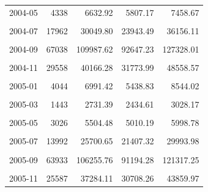 \begin{longtable}[t]{crrrr}
2004-05 & 4338 & 6632.92 & 5807.17 & 7458.67\\
\cellcolor{gray!10}{2004-06} & \cellcolor{gray!10}{13659} & \cellcolor{gray!10}{18876.15} & \cellcolor{gray!10}{13404.12} & \cellcolor{gray!10}{24348.18}\\
2004-07 & 17962 & 30049.80 & 23943.49 & 36156.11\\
\cellcolor{gray!10}{2004-08} & \cellcolor{gray!10}{37359} & \cellcolor{gray!10}{71768.44} & \cellcolor{gray!10}{50429.73} & \cellcolor{gray!10}{93107.15}\\
2004-09 & 67038 & 109987.62 & 92647.23 & 127328.01\\
\cellcolor{gray!10}{2004-10} & \cellcolor{gray!10}{39184} & \cellcolor{gray!10}{53851.39} & \cellcolor{gray!10}{51658.87} & \cellcolor{gray!10}{56043.91}\\
2004-11 & 29558 & 40166.28 & 31773.99 & 48558.57\\
\cellcolor{gray!10}{2004-12} & \cellcolor{gray!10}{17505} & \cellcolor{gray!10}{26444.55} & \cellcolor{gray!10}{20838.85} & \cellcolor{gray!10}{32050.24}\\
2005-01 & 4044 & 6991.42 & 5438.83 & 8544.02\\
\cellcolor{gray!10}{2005-02} & \cellcolor{gray!10}{1349} & \cellcolor{gray!10}{2534.68} & \cellcolor{gray!10}{1905.60} & \cellcolor{gray!10}{3163.76}\\
2005-03 & 1443 & 2731.39 & 2434.61 & 3028.17\\
\cellcolor{gray!10}{2005-04} & \cellcolor{gray!10}{1209} & \cellcolor{gray!10}{2874.58} & \cellcolor{gray!10}{2583.10} & \cellcolor{gray!10}{3166.06}\\
2005-05 & 3026 & 5504.48 & 5010.19 & 5998.78\\
\cellcolor{gray!10}{2005-06} & \cellcolor{gray!10}{4598} & \cellcolor{gray!10}{9823.57} & \cellcolor{gray!10}{6241.40} & \cellcolor{gray!10}{13405.75}\\
2005-07 & 13992 & 25700.65 & 21407.32 & 29993.98\\
\cellcolor{gray!10}{2005-08} & \cellcolor{gray!10}{52604} & \cellcolor{gray!10}{72151.60} & \cellcolor{gray!10}{38702.57} & \cellcolor{gray!10}{105600.63}\\
2005-09 & 63933 & 106255.76 & 91194.28 & 121317.25\\
\cellcolor{gray!10}{2005-10} & \cellcolor{gray!10}{48878} & \cellcolor{gray!10}{63322.04} & \cellcolor{gray!10}{60430.48} & \cellcolor{gray!10}{66213.60}\\
2005-11 & 25587 & 37284.11 & 30708.26 & 43859.97\\

\end{longtable}
